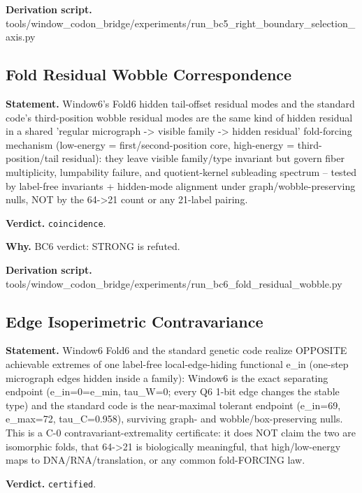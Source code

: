 \textbf{Derivation script.} tools/window\_codon\_bridge/experiments/run\_bc5\_right\_boundary\_selection\_axis.py

\subsection{Fold Residual Wobble Correspondence}\label{sec:bridge-fold-residual-wobble-correspondence}
\textbf{Statement.} Window6's Fold6 hidden tail-offset residual modes and the standard code's third-position wobble
residual modes are the same kind of hidden residual in a shared 'regular micrograph -> visible
family -> hidden residual' fold-forcing mechanism (low-energy = first/second-position core,
high-energy = third-position/tail residual): they leave visible family/type invariant but govern
fiber multiplicity, lumpability failure, and quotient-kernel subleading spectrum -- tested by
label-free invariants + hidden-mode alignment under graph/wobble-preserving nulls, NOT by the 64->21
count or any 21-label pairing.

\textbf{Verdict.} \texttt{coincidence}.

\textbf{Why.} BC6 verdict: STRONG is refuted.

\textbf{Derivation script.} tools/window\_codon\_bridge/experiments/run\_bc6\_fold\_residual\_wobble.py

\subsection{Edge Isoperimetric Contravariance}\label{sec:bridge-edge-isoperimetric-contravariance}
\textbf{Statement.} Window6 Fold6 and the standard genetic code realize OPPOSITE achievable extremes of one label-free
local-edge-hiding functional e\_in (one-step micrograph edges hidden inside a family): Window6 is
the exact separating endpoint (e\_in=0=e\_min, tau\_W=0; every Q6 1-bit edge changes the stable
type) and the standard code is the near-maximal tolerant endpoint (e\_in=69, e\_max=72,
tau\_C=0.958), surviving graph- and wobble/box-preserving nulls. This is a C-0
contravariant-extremality certificate: it does NOT claim the two are isomorphic folds, that 64->21
is biologically meaningful, that high/low-energy maps to DNA/RNA/translation, or any common
fold-FORCING law.

\textbf{Verdict.} \texttt{certified}.

